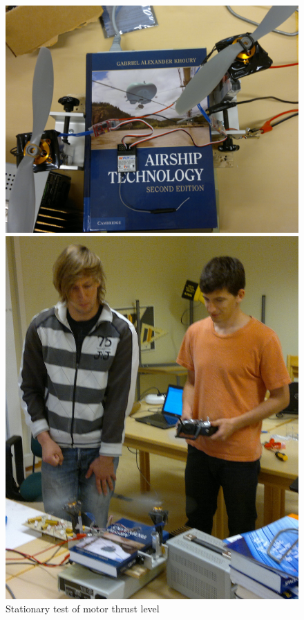 \begin{figure}[bht]
\centering
\begin{minipage}[c]{0.48\textwidth}
\centering
\includegraphics[scale=0.28]{figures/fig_CDR_MCC_motor_thrust_test1.jpg}
\end{minipage}
\vspace{2mm}
\begin{minipage}[c]{0.48\textwidth}
\centering
\includegraphics[scale=0.4]{figures/fig_CDR_MCC_motor_thrust_test2.jpg}
\end{minipage}
\caption{Stationary test of motor thrust level}
\label{fig:motor_thrust_level}
\end{figure}
%
%
\newpage
